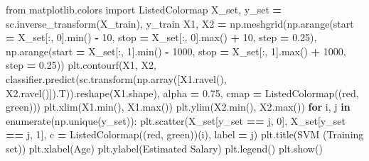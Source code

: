 \documentclass[
]{book}
\newenvironment{Shaded}{\begin{snugshade}}{\end{snugshade}}
\newcommand{\BuiltInTok}[1]{#1}
\newcommand{\ControlFlowTok}[1]{\textcolor[rgb]{0.13,0.29,0.53}{\textbf{#1}}}
\newcommand{\DecValTok}[1]{\textcolor[rgb]{0.00,0.00,0.81}{#1}}
\newcommand{\FloatTok}[1]{\textcolor[rgb]{0.00,0.00,0.81}{#1}}
\newcommand{\ImportTok}[1]{#1}
\newcommand{\KeywordTok}[1]{\textcolor[rgb]{0.13,0.29,0.53}{\textbf{#1}}}
\newcommand{\NormalTok}[1]{#1}
\newcommand{\OperatorTok}[1]{\textcolor[rgb]{0.81,0.36,0.00}{\textbf{#1}}}
\newcommand{\StringTok}[1]{\textcolor[rgb]{0.31,0.60,0.02}{#1}}
\theoremstyle{definition}
\theoremstyle{definition}
\theoremstyle{definition}
\theoremstyle{definition}
\theoremstyle{remark}
\begin{document}
\begin{Shaded}
\begin{Highlighting}[]
\ImportTok{from}\NormalTok{ matplotlib.colors }\ImportTok{import}\NormalTok{ ListedColormap}
\NormalTok{X\_set, y\_set }\OperatorTok{=}\NormalTok{ sc.inverse\_transform(X\_train), y\_train}
\NormalTok{X1, X2 }\OperatorTok{=}\NormalTok{ np.meshgrid(np.arange(start }\OperatorTok{=}\NormalTok{ X\_set[:, }\DecValTok{0}\NormalTok{].}\BuiltInTok{min}\NormalTok{() }\OperatorTok{{-}} \DecValTok{10}\NormalTok{, stop }\OperatorTok{=}\NormalTok{ X\_set[:, }\DecValTok{0}\NormalTok{].}\BuiltInTok{max}\NormalTok{() }\OperatorTok{+} \DecValTok{10}\NormalTok{, step }\OperatorTok{=} \FloatTok{0.25}\NormalTok{),}
\NormalTok{                     np.arange(start }\OperatorTok{=}\NormalTok{ X\_set[:, }\DecValTok{1}\NormalTok{].}\BuiltInTok{min}\NormalTok{() }\OperatorTok{{-}} \DecValTok{1000}\NormalTok{, stop }\OperatorTok{=}\NormalTok{ X\_set[:, }\DecValTok{1}\NormalTok{].}\BuiltInTok{max}\NormalTok{() }\OperatorTok{+} \DecValTok{1000}\NormalTok{, step }\OperatorTok{=} \FloatTok{0.25}\NormalTok{))}
\NormalTok{plt.contourf(X1, X2, classifier.predict(sc.transform(np.array([X1.ravel(), X2.ravel()]).T)).reshape(X1.shape),}
\NormalTok{             alpha }\OperatorTok{=} \FloatTok{0.75}\NormalTok{, cmap }\OperatorTok{=}\NormalTok{ ListedColormap((}\StringTok{\textquotesingle{}red\textquotesingle{}}\NormalTok{, }\StringTok{\textquotesingle{}green\textquotesingle{}}\NormalTok{)))}
\NormalTok{plt.xlim(X1.}\BuiltInTok{min}\NormalTok{(), X1.}\BuiltInTok{max}\NormalTok{())}
\NormalTok{plt.ylim(X2.}\BuiltInTok{min}\NormalTok{(), X2.}\BuiltInTok{max}\NormalTok{())}
\ControlFlowTok{for}\NormalTok{ i, j }\KeywordTok{in} \BuiltInTok{enumerate}\NormalTok{(np.unique(y\_set)):}
\NormalTok{    plt.scatter(X\_set[y\_set }\OperatorTok{==}\NormalTok{ j, }\DecValTok{0}\NormalTok{], X\_set[y\_set }\OperatorTok{==}\NormalTok{ j, }\DecValTok{1}\NormalTok{], c }\OperatorTok{=}\NormalTok{ ListedColormap((}\StringTok{\textquotesingle{}red\textquotesingle{}}\NormalTok{, }\StringTok{\textquotesingle{}green\textquotesingle{}}\NormalTok{))(i), label }\OperatorTok{=}\NormalTok{ j)}
\NormalTok{plt.title(}\StringTok{\textquotesingle{}SVM (Training set)\textquotesingle{}}\NormalTok{)}
\NormalTok{plt.xlabel(}\StringTok{\textquotesingle{}Age\textquotesingle{}}\NormalTok{)}
\NormalTok{plt.ylabel(}\StringTok{\textquotesingle{}Estimated Salary\textquotesingle{}}\NormalTok{)}
\NormalTok{plt.legend()}
\NormalTok{plt.show()}
\end{Highlighting}
\end{Shaded}
\end{document}
